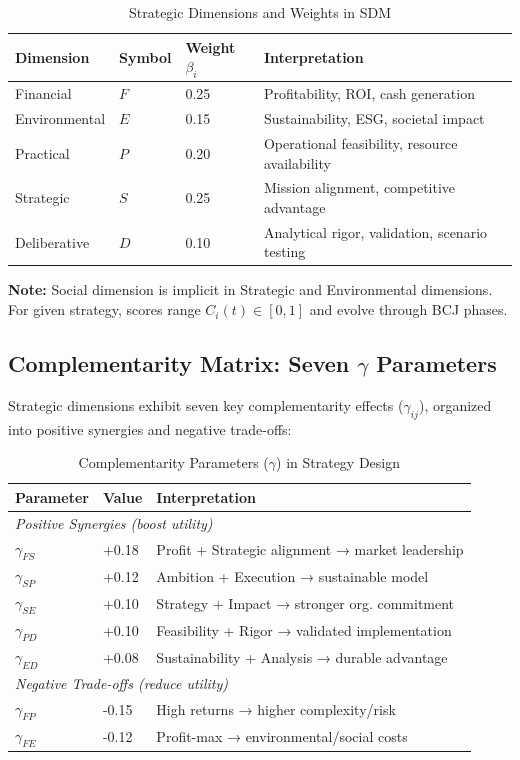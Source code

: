 \begin{table}[htbp]
\centering
\caption{Strategic Dimensions and Weights in SDM}
\label{tab:sdm-dimensions}
\renewcommand{\arraystretch}{1.4}
\begin{tabular}{@{}lllp{5cm}@{}}
\toprule
\textbf{Dimension} & \textbf{Symbol} & \textbf{Weight $\beta_i$} & \textbf{Interpretation} \\
\midrule
Financial & $F$ & 0.25 & Profitability, ROI, cash generation \\
Environmental & $E$ & 0.15 & Sustainability, ESG, societal impact \\
Practical & $P$ & 0.20 & Operational feasibility, resource availability \\
Strategic & $S$ & 0.25 & Mission alignment, competitive advantage \\
Deliberative & $D$ & 0.10 & Analytical rigor, validation, scenario testing \\
\bottomrule
\end{tabular}
\end{table}

\textbf{Note:} Social dimension is implicit in Strategic and Environmental dimensions. For given strategy, scores range $C_i(t) \in [0,1]$ and evolve through BCJ phases.

\subsection{Complementarity Matrix: Seven $\gamma$ Parameters}
\label{subsec:sdm-gamma}

Strategic dimensions exhibit seven key complementarity effects ($\gamma_{ij}$), organized into positive synergies and negative trade-offs:

\begin{table}[htbp]
\centering
\caption{Complementarity Parameters ($\gamma$) in Strategy Design}
\label{tab:sdm-gamma}
\renewcommand{\arraystretch}{1.4}
\begin{tabular}{@{}llp{7cm}@{}}
\toprule
\textbf{Parameter} & \textbf{Value} & \textbf{Interpretation} \\
\midrule
\multicolumn{3}{l}{\textit{Positive Synergies (boost utility)}} \\
$\gamma_{FS}$ & +0.18 & Profit + Strategic alignment → market leadership \\
$\gamma_{SP}$ & +0.12 & Ambition + Execution → sustainable model \\
$\gamma_{SE}$ & +0.10 & Strategy + Impact → stronger org. commitment \\
$\gamma_{PD}$ & +0.10 & Feasibility + Rigor → validated implementation \\
$\gamma_{ED}$ & +0.08 & Sustainability + Analysis → durable advantage \\
\midrule
\multicolumn{3}{l}{\textit{Negative Trade-offs (reduce utility)}} \\
$\gamma_{FP}$ & -0.15 & High returns → higher complexity/risk \\
$\gamma_{FE}$ & -0.12 & Profit-max → environmental/social costs \\
\bottomrule
\end{tabular}
\end{table}

